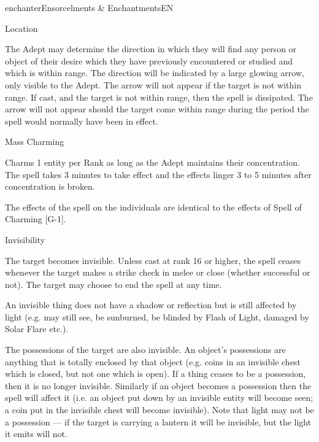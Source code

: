 \begin{College}[1.1]{enchanter}{Ensorcelments \& Enchantments}{EN}
\begin{spell}[G-6]{Location}
\begin{effects}
The Adept may determine the direction in which they will find any
person or object of their desire which they have previously
encountered or studied and which is within range.  The direction will
be indicated by a large glowing arrow, only visible to the Adept.  The
arrow will not appear if the target is not within range. If cast, and
the target is not within range, then the spell is dissipated. The
arrow will not appear should the target come within range during the
period the spell would normally have been in effect.
\end{effects}
\end{spell}

\begin{spell}[G-7]{Mass Charming}

\begin{effects}
Charms 1 entity per Rank as long as the Adept maintains their
concentration.  The spell takes 3 minutes to take effect and the
effects linger 3 to 5 minutes after concentration is broken.

The effects of the spell on the individuals are identical to the
effects of Spell of Charming [G-1].
\end{effects}
\end{spell}

\begin{spell}[G-8]{Invisibility}
\begin{effects}
The target becomes invisible.  Unless cast at rank 16 or higher, the
spell ceases whenever the target makes a strike check in melee or
close (whether successful or not). The target may choose to end the
spell at any time.

An invisible thing does not have a shadow or reflection but is still
affected by light (e.g.  may still see, be sunburned, be blinded by
Flash of Light, damaged by Solar Flare etc.).

The possessions of the target are also invisible. An object’s
possessions are anything that is totally enclosed by that object (e.g.
coins in an invisible chest which is closed, but not one which is
open).  If a thing ceases to be a possession, then it is no longer
invisible.  Similarly if an object becomes a possession then the spell
will affect it (i.e.  an object put down by an invisible entity will
become seen; a coin put in the invisible chest will become invisible).
Note that light may not be a possession — if the target is carrying a
lantern it will be invisible, but the light it emits will not.
\end{effects}
\end{spell}


\end{College}
